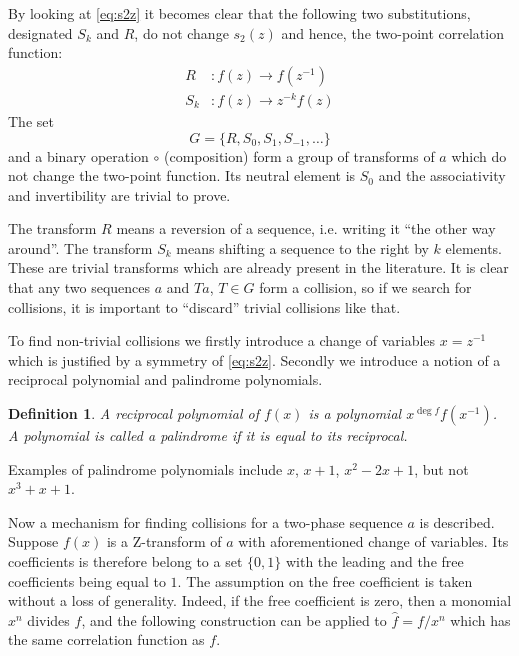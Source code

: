 \documentclass[12pt, a4paper]{article}
\newtheorem{definition}{Definition}
\begin{document}
By looking at \cref{eq:s2z} it becomes clear that the following two
substitutions, designated $S_k$ and $R$, do not change $s_2(z)$ and hence, the
two-point correlation function:
\begin{equation}
  \begin{aligned}
    R&: f(z) \rightarrow f(z^{-1}) \\
    S_k&: f(z) \rightarrow z^{-k}f(z)
  \end{aligned}
  \label{eq:group-elts}
\end{equation}
The set
\begin{equation}
  G = \{R, S_0, S_1, S_{-1}, \dots \}
  \label{eq:group}
\end{equation}
and a binary operation $\circ$ (composition) form a group of transforms of $a$
which do not change the two-point function. Its neutral element is $S_0$ and the
associativity and invertibility are trivial to prove.

The transform $R$ means a reversion of a sequence, i.e. writing it ``the other
way around''. The transform $S_k$ means shifting a sequence to the right by $k$
elements. These are trivial transforms which are already present in the
literature. It is clear that any two sequences $a$ and $Ta$, $T \in G$ form a
collision, so if we search for collisions, it is important to ``discard''
trivial collisions like that.

To find non-trivial collisions we firstly introduce a change of variables
$x = z^{-1}$ which is justified by a symmetry of \cref{eq:s2z}. Secondly we
introduce a notion of a reciprocal polynomial and palindrome polynomials.
\begin{definition}
  A reciprocal polynomial of $f(x)$ is a polynomial $x^{\deg f}f(x^{-1})$. A
  polynomial is called a palindrome if it is equal to its reciprocal.
\end{definition}
Examples of palindrome polynomials include $x$, $x + 1$, $x^2 - 2x + 1$, but not
$x^3+x+1$.

Now a mechanism for finding collisions for a two-phase sequence $a$ is
described. Suppose $f(x)$ is a Z-transform of $a$ with aforementioned change of
variables. Its coefficients is therefore belong to a set $\{0, 1\}$ with the
leading and the free coefficients being equal to $1$. The assumption on the free
coefficient is taken without a loss of generality. Indeed, if the free
coefficient is zero, then a monomial $x^n$ divides $f$, and the following
construction can be applied to $\hat{f} = f / x^n$ which has the same
correlation function as $f$.
\end{document}
